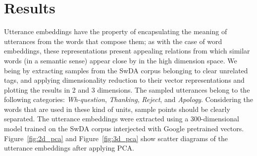 \section{Results}\label{sec:results}

Utterance embeddings have the property of encapsulating the meaning of utterances from the words that compose them; as with the case of word embeddings, these representations present appealing relations from which similar words (in a semantic sense) appear close by in the high dimension space. We being by extracting samples from the SwDA corpus belonging to clear unrelated tags, and applying dimensionality reduction to their vector representations and plotting the results in 2 and 3 dimensions. The sampled utterances belong to the following categories: \emph{Wh-question}, \emph{Thanking}, \emph{Reject}, and \emph{Apology}. Considering the words that are used in these kind of units, sample points should be clearly separated. The utterance embeddings were extracted using a 300-dimensional model trained on the SwDA corpus interjected with Google pretrained vectors. Figure~\ref{fig:2d_pca} and Figure~\ref{fig:3d_pca} show scatter diagrams of the utterance embeddings after applying PCA.

